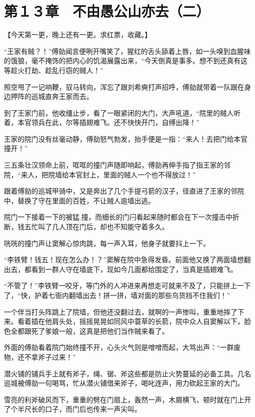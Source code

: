 \section{第１３章　不由愚公山亦去（二）}

【今天第一更，晚上还有一更。求红票，收藏。】

“王家有贼？！”傅勍闻言便咧开嘴笑了，猩红的舌头舔着上唇，如一头嗅到血腥味的饿狼，毫不掩饰的把内心的饥渴展露出来，“今天倒真是事多。想不到还真有这等趁火打劫、趁乱行窃的贼人！”

照空甩了一记响鞭，驭马转向，浑忘了跟刘希奭打声招呼，傅勍就带着一队跟在身边押阵的巡城直奔王家而去。

到了王家门前，他收缰止步，看了一眼紧闭的大门，大声吼道，“院里的贼人听着，本官领兵在此，尔等插翅难飞。还不快快开门，自缚出降！”

王家的院门没有丝毫动静，傅勍怒气勃发，抬手便是一指：“来人！去把门给本官撞开！”

三五条壮汉领命上前，哐哐的撞门声随即响起，傅勍再伸手指了指王家的邻院，“来人，把院墙给本官封上，里面的贼人一个也不得放过！”

跟着傅勍的巡城甲骑中，又是奔出了几个手提弓箭的汉子，径直进了王家的邻院中，替换了守在里面的百姓，不让贼人逾墙出逃。

院门一下接着一下的被猛.撞，而细长的门闩看起来随时都会在下一次撞击中折断，钱五忙叫了几人顶在门后，却也不知能守着多久。

咣咣的撞门声让窦解心惊肉跳，每一声入耳，他身子就要抖上一下。

“李铁臂！钱五！现在怎么办！？”窦解在院中急得发昏。前面他又换了两面墙想翻出去，都看到一群人守在墙底下，现如今几面都给围定了，当真是插翅难飞。

“不管了！”李铁臂一咬牙，等门外的人冲进来再想走可就来不及了，只能拼上一下了，“快，护着七衙内翻墙出去！拼一拼，墙对面的那些鸟货挡不住我们！”

一个伴当打头阵跳上了院墙，但他还没翻过去，就啊的一声惨叫，重重地摔了下来。看着插在他肩头处，摇摇晃晃如同风中蓑草的长箭，院中众人自窦解以下，脸色全都跟死了爹娘一般，这真是把他们当作贼来看了。

外面的傅勍看着院门始终撞不开，心头火气则是噌噌而起，大骂出声：“一群废物，还不拿斧子过来！”

潜火铺的铺兵手上就有斧子，绳、锯、斧这些都是防止火势蔓延的必备工具。几名巡城被傅勍一句喝骂，忙从潜火铺借来斧子，喝叱连声，用力砍起王家的大门。

雪亮的利斧破风而下，重重的劈在门扇上，轰然一声，木屑横飞，顿时就在门上开了个半尺长的口子，而门后也传来一声尖叫。

